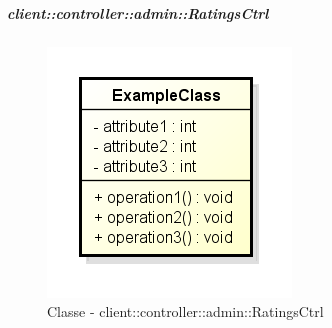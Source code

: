 		\subparagraph{client::controller::admin::RatingsCtrl} %
		\label{subp:bdsm_app_client_controller_admin_ratingsctrl}
			\begin{figure}[htbp]
				\centering
				\centerline{\includegraphics[scale=0.7]{./images/client/classes/example_class.png}}
				\caption{Classe - client::controller::admin::RatingsCtrl}
			\end{figure}
